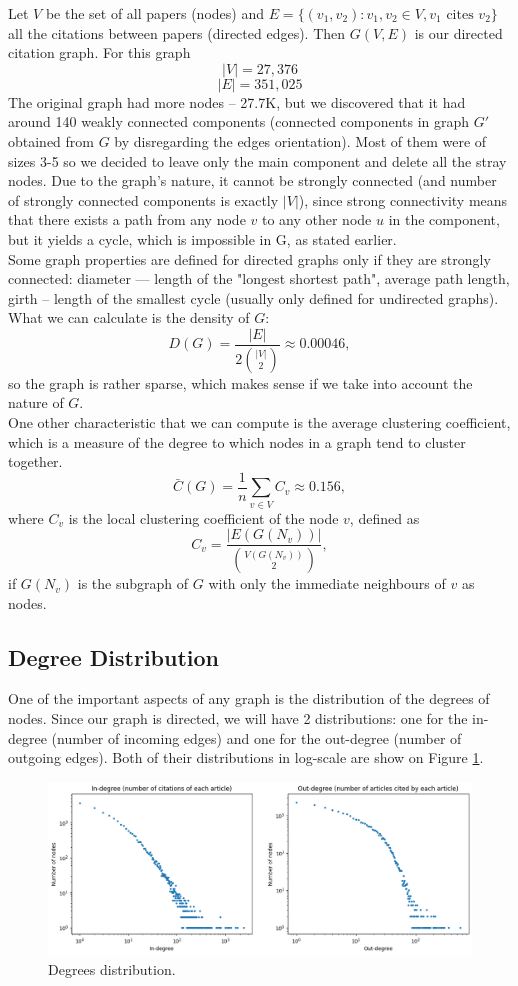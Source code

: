 \tab Let $V$ be the set of all papers (nodes) and $E = \{(v_1, v_2): v_1, v_2 \in V, v_1 \text{ cites } v_2 \}$ all the citations between papers (directed edges). Then $G(V, E)$ is our directed citation graph.
For this graph $$|V| = 27,376$$ $$|E| = 351,025$$
\tab The original graph had more nodes -- 27.7K, but we discovered that it had around 140 weakly connected components (connected components in graph $G'$ obtained from $G$ by disregarding the edges orientation). Most of them were of sizes 3-5 so we decided to leave only the main component and delete all the stray nodes. Due to the graph's nature, it cannot be strongly connected (and number of strongly connected components is exactly $|V|$), since strong connectivity means that there exists a path from any node $v$ to any other node $u$ in the component, but it yields a cycle, which is impossible in G, as stated earlier. \\
\tab Some graph properties are defined for directed graphs only if they are strongly connected: diameter --- length of the "longest shortest path", average path length, girth -- length of the smallest cycle (usually only defined for undirected graphs). What we can calculate is the density of $G$:
$$D(G) = \frac{|E|}{2\binom{|V|}{2}} \approx 0.00046,$$
so the graph is rather sparse, which makes sense if we take into account the nature of $G$.\\
\tab One other characteristic that we can compute is the average clustering coefficient, which is a measure of the degree to which nodes in a graph tend to cluster together. 
$$\bar{C}(G) = \frac{1}{n}\sum_{v \in V}C_v \approx 0.156,$$
where $C_v$ is the local clustering coefficient of the node $v$, defined as $$C_v = \frac{|E(G(N_v))|}{\binom{V(G(N_v))}{2}},$$
if $G(N_v)$ is the subgraph of $G$ with only the immediate neighbours of $v$  as nodes.

\subsection{Degree Distribution}
\tab One of the important aspects of any graph is the distribution of the degrees of nodes. Since our graph is directed, we will have 2 distributions: one for the in-degree (number of incoming edges) and one for the out-degree (number of outgoing edges). Both of their distributions in log-scale are show on Figure \ref{plot:degree}.

\begin{figure}[h]
\centering
\includegraphics[width=1\linewidth]{degree_distribution.png}
\caption{Degrees distribution.}
\label{plot:degree}
\end{figure}

